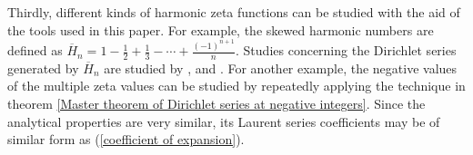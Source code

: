 \documentclass{article}
\begin{document}
Thirdly, different kinds of harmonic zeta functions can be studied with the aid of the tools used in this paper. For example, the skewed harmonic numbers are defined as $\overline{H}_n=1-\frac{1}{2}+\frac{1}{3}-\cdots+\frac{(-1)^{n+1}}{n}$. Studies concerning the Dirichlet series generated by $\overline{H}_n$ are studied by \cite{alzer2020four}, \cite{boyadzhiev2009alternating} and \cite{flajolet1998euler}. For another example, the negative values of the multiple zeta values can be studied by repeatedly applying the technique in theorem \ref{Master theorem of Dirichlet series at negative integers}. Since the analytical properties are very similar, its Laurent series coefficients may be of similar form as (\ref{coefficient of expansion}). 




\end{document}
